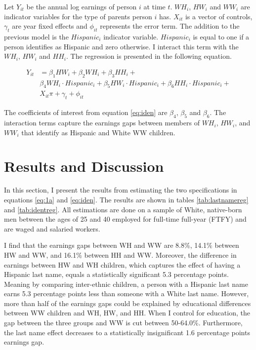 \documentclass{wptemp}
\begin{document}
Let $Y_{it}$ be the annual log earnings of person $i$ at time $t$. $WH_{i}$, $HW_{i}$ and $WW_{i}$ are indicator variables for the type of parents person $i$ has. $X_{it}$ is a vector of controls, $\gamma_{t}$ are year fixed effects and $\phi_{it}$ represents the error term. The addition to the previous model is the $Hispanic_{i}$ indicator variable. $Hispanic_{i}$ is equal to one if a person identifies as Hispanic and zero otherwise. I interact this term with the $WH_{i}$, $HW_{i}$ and $HH_{i}$.  The regression is presented in the following equation.

\begin{align} \label{eq:iden}
Y_{it} &= \beta_{1} HW_{i} +  \beta_{2} WH_{i} + \beta_{3} HH_{i} +\\
& \beta_{4} WH_{i} \cdot Hispanic_{i} + \beta_{5} HW_{i}\cdot Hispanic_{i} +  \beta_{6} HH_{i} \cdot Hispanic_{i}+ \nonumber \\
&X_{it} \pi + \gamma_{t}+\phi_{it} \nonumber
\end{align}

The coefficients of interest from equation \ref{eq:iden} are $\beta_{4}$, $\beta_{5}$ and $\beta_{6}$. The interaction terms capture the earnings gaps between members of $WH_{i}$, $HW_{i}$, and $WW_{i}$ that identify as Hispanic and White WW children. 

\section{Results and Discussion}\label{sec:results}

In this section, I present the results from estimating the two specifications in equations \ref{eq:1a} and \ref{eq:iden}. The results are shown in tables \ref{tab:lastnamereg} and \ref{tab:identreg}. All estimations are done on a sample of White, native-born men between the ages of 25 and 40 employed for full-time full-year (FTFY) and are waged and salaried workers.

I find that the earnings gaps between WH and WW are 8.8\%, 14.1\% between HW and WW, and 16.1\% between HH and WW. Moreover, the difference in earnings between HW and WH children, which captures the effect of having a Hispanic last name, equals a statistically significant 5.3 percentage points. Meaning by comparing inter-ethnic children, a person with a Hispanic last name earns 5.3 percentage points less than someone with a White last name. However, more than half of the earnings gaps could be explained by educational differences between WW children and WH, HW, and HH. When I control for education, the gap between the three groups and WW is cut between 50-64.0\%. Furthermore, the last name effect decreases to a statistically insignificant 1.6 percentage points earnings gap.
\end{document}
